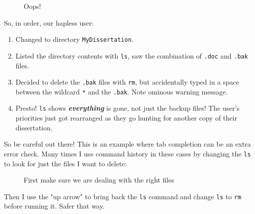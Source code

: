 \documentclass[10pt,american,]{book}
\newenvironment{Shaded}{\begin{snugshade}}{\end{snugshade}}
\newcommand{\KeywordTok}[1]{\textcolor[rgb]{0.13,0.29,0.53}{\textbf{{#1}}}}
\newcommand{\NormalTok}[1]{{#1}}
\numberwithin{figure}{chapter}
\DeclareRobustCommand{\drcap}[1]{\begin{figure}[H]\caption{#1}\end{figure}}
\renewcommand{\KeywordTok}[1]{{#1}}
\renewcommand{\NormalTok}[1]{{#1}}
\begin{document}
\drcap{Oops!}

\begin{Shaded}
\end{Shaded}

So, in order, our hapless user:

\begin{enumerate}
\def\labelenumi{\arabic{enumi}.}
\item
  Changed to directory \texttt{MyDissertation}.
\item
  Listed the directory contents with \texttt{ls}, saw the combination of
  \texttt{.doc} and \texttt{.bak} files.
\item
  Decided to delete the \texttt{.bak} files with \texttt{rm}, but
  accidentally typed in a space between the wildcard \texttt{*} and the
  \texttt{.bak}. Note ominous warning message.
\item
  Presto! \texttt{ls} shows \textbf{\emph{everything}} is gone, not just
  the backup files! The user's priorities just got rearranged as they go
  hunting for another copy of their dissertation.
\end{enumerate}

So be careful out there! This is an example where tab completion can be
an extra error check. Many times I use command history in these cases by
changing the \texttt{ls} to look for just the files I want to delete:

\drcap{First make sure we are dealing with the right files}

\begin{Shaded}
\end{Shaded}

Then I use the "up arrow" to bring back the \texttt{ls} command and
change \texttt{ls} to \texttt{rm} before running it. Safer that way.
\end{document}
